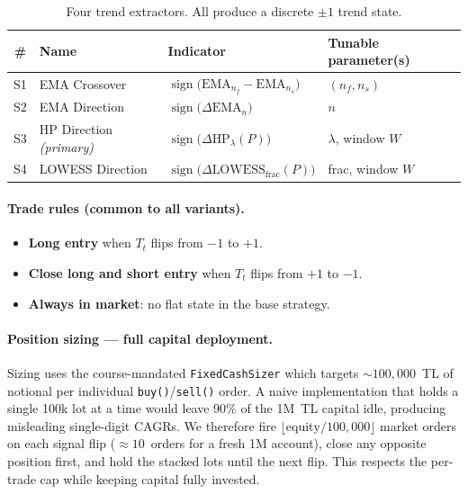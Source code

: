 \documentclass[11pt,a4paper]{article}
\begin{document}
\begin{table}[h]
\centering
\begin{tabular}{@{}clll@{}}
\toprule
\textbf{\#} & \textbf{Name} & \textbf{Indicator} & \textbf{Tunable parameter(s)} \\
\midrule
S1 & EMA Crossover  & $\operatorname{sign}\!\bigl(\text{EMA}_{n_f} - \text{EMA}_{n_s}\bigr)$ & $(n_f, n_s)$ \\
S2 & EMA Direction  & $\operatorname{sign}\!\bigl(\Delta \text{EMA}_n\bigr)$ & $n$ \\
S3 & HP Direction \emph{(primary)} & $\operatorname{sign}\!\bigl(\Delta \text{HP}_\lambda(P)\bigr)$ & $\lambda$, window $W$ \\
S4 & LOWESS Direction & $\operatorname{sign}\!\bigl(\Delta \text{LOWESS}_{\text{frac}}(P)\bigr)$ & frac, window $W$ \\
\bottomrule
\end{tabular}
\caption{Four trend extractors. All produce a discrete $\pm 1$ trend state.}
\end{table}

\paragraph{Trade rules (common to all variants).}
\begin{itemize}[leftmargin=1.5em,itemsep=2pt]
    \item \textbf{Long entry} when $T_t$ flips from $-1$ to $+1$.
    \item \textbf{Close long and short entry} when $T_t$ flips from $+1$ to $-1$.
    \item \textbf{Always in market}: no flat state in the base strategy.
\end{itemize}

\paragraph{Position sizing --- full capital deployment.}
Sizing uses the course-mandated \texttt{FixedCashSizer} which targets
$\sim\!100{,}000$~TL of notional per individual \texttt{buy()}/\texttt{sell()}
order. A naive implementation that holds a single 100k lot at a time would
leave 90\% of the 1M~TL capital idle, producing misleading single-digit CAGRs.
We therefore fire $\lfloor \text{equity}/100{,}000 \rfloor$ market orders on
each signal flip ($\approx 10$~orders for a fresh 1M account), close any
opposite position first, and hold the stacked lots until the next flip. This
respects the per-trade cap while keeping capital fully invested.
\end{document}
